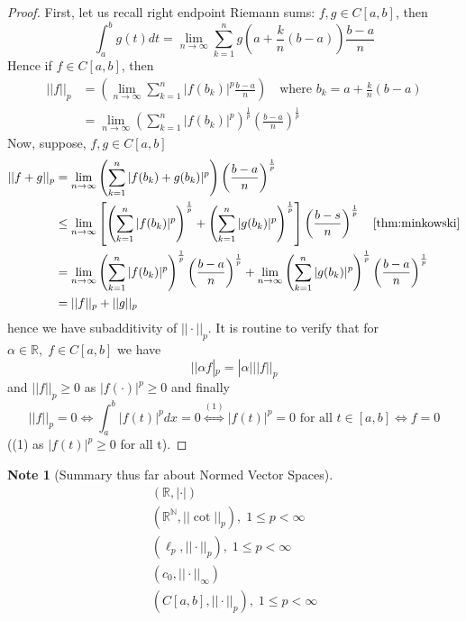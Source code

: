 \documentclass[11pt, oneside]{book}
\theoremstyle{break}
\newtheorem*{proof}{Proof}
\newtheorem*{note}{Note}
\newcommand{\bb}[1]{\mathbb{#1}}			%
\begin{document}
\begin{proof}
	First, let us recall right endpoint Riemann sums: $f, g \in C[a,b]$, then
	\begin{equation}
		\int_{a}^{b} g(t) dt = \lim_{n \to \infty} \sum_{k=1}^{n} g \left(a + \frac{k}{n} (b - a) \right)\frac{b-a}{n}
	\end{equation}
	Hence if $f \in C[a,b]$, then
	\begin{align*}
		||f||_p &= \left( \lim_{n \to \infty} \sum_{k=1}^{n} |f(b_k)|^p \frac{b-a}{n}  \right) \quad \text{where } b_k = a + \frac{k}{n} (b - a) \\
			&= \lim_{n \to \infty} \left(\sum_{k=1}^{n} |f(b_k)|^p \right)^{\frac{1}{p}} \left( \frac{b-a}{n} \right)^{\frac{1}{p}}
	\end{align*}
	Now, suppose, $f, g \in C[a,b]$
	\begin{align*}
		||f + g||_p &= \lim_{n \to \infty} \left( \sum_{k=1}^{n} |f(b_k) + g(b_k)|^p \right) \left(\frac{b-a}{n} \right)^{\frac{1}{p}} \\
			&\leq \lim_{n \to \infty} \left[ \left(\sum_{k=1}^{n} |f(b_k)|^p \right)^{\frac{1}{p}} + \left(\sum_{k=1}^{n} |g(b_k)|^p \right)^{\frac{1}{p}} \right] \left( \frac{b-s}{n} \right)^{\frac{1}{p}} \quad \autoref{thm:minkowski} \\
			&= \lim_{n \to \infty} \left(\sum_{k=1}^{n} |f(b_k)|^p \right)^{\frac{1}{p}} \left( \frac{b-a}{n} \right)^{\frac{1}{p}} + \lim_{n \to \infty} \left(\sum_{k=1}^{n} |g(b_k)|^p \right)^{\frac{1}{p}} \left( \frac{b-a}{n} \right)^{\frac{1}{p}} \\
			&= ||f||_p + ||g||_p
	\end{align*}
	hence we have subadditivity of $||\cdot||_p$. It is routine to verify that for $\alpha \in \bb{R}, \; f \in C[a,b]$ we have
	\begin{equation}
		||\alpha f|_p = |\alpha|||f||_p
	\end{equation}
	and $||f||_p \geq 0$ as $|f(\cdot)|^p \geq 0$ and finally
	\begin{equation}
		||f||_p = 0 \iff \int_{a}^{b} |f(t)|^p dx = 0 \overset{(1)}{\iff} |f(t)|^p = 0 \text{ for all } t \in [a,b] \iff f = 0
	\end{equation}
	((1) as $|f(t)|^p \geq 0$ for all t).
\end{proof}

\begin{note}[Summary thus far about Normed Vector Spaces]
	\begin{gather*}
		(\bb{R}, |\cdot|) \\
		(\bb{R}^\bb{N}, ||\cot||_p), \; 1 \leq p < \infty \\
		(\ell_p, ||\cdot||_p), \; 1 \leq p < \infty \\
		(c_0, ||\cdot||_\infty) \\
		(C[a,b], ||\cdot||_p), \; 1 \leq p < \infty
	\end{gather*}
\end{note}
\end{document}
